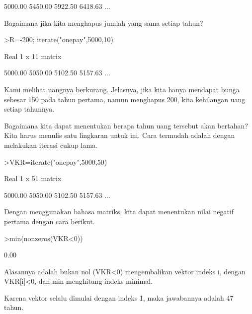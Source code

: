 \documentclass[a4paper,10pt]{article}
\begin{document}
\begin{eulernotebook}
\begin{eulercomment}
\begin{eulercomment}
\begin{eulercomment}
\begin{eulercomment}
\begin{eulercomment}
\begin{eulercomment}
\begin{eulercomment}
\begin{eulercomment}
\begin{eulercomment}
\begin{eulercomment}
\begin{eulercomment}
\begin{eulercomment}
\begin{euleroutput}
      5000.00     5450.00     5922.50     6418.63     ...
\end{euleroutput}
\begin{eulercomment}
Bagaimana jika kita menghapus jumlah yang sama setiap tahun?
\end{eulercomment}
\begin{eulerprompt}
>R=-200; iterate("onepay",5000,10)
\end{eulerprompt}
\begin{euleroutput}
  Real 1 x 11 matrix
  
      5000.00     5050.00     5102.50     5157.63     ...
\end{euleroutput}
\begin{eulercomment}
Kami melihat uangnya berkurang. Jelasnya, jika kita hanya mendapat
bunga sebesar 150 pada tahun pertama, namun menghapus 200, kita
kehilangan uang setiap tahunnya.

Bagaimana kita dapat menentukan berapa tahun uang tersebut akan
bertahan? Kita harus menulis satu lingkaran untuk ini. Cara termudah
adalah dengan melakukan iterasi cukup lama.
\end{eulercomment}
\begin{eulerprompt}
>VKR=iterate("onepay",5000,50)
\end{eulerprompt}
\begin{euleroutput}
  Real 1 x 51 matrix
  
      5000.00     5050.00     5102.50     5157.63     ...
\end{euleroutput}
\begin{eulercomment}
Dengan menggunakan bahasa matriks, kita dapat menentukan nilai negatif
pertama dengan cara berikut.
\end{eulercomment}
\begin{eulerprompt}
>min(nonzeros(VKR<0))
\end{eulerprompt}
\begin{euleroutput}
         0.00 
\end{euleroutput}
\begin{eulercomment}
Alasannya adalah bukan nol (VKR\textless{}0) mengembalikan vektor indeks i,
dengan VKR[i]\textless{}0, dan min menghitung indeks minimal.

Karena vektor selalu dimulai dengan indeks 1, maka jawabannya adalah
47 tahun.


\end{eulercomment}
\end{eulercomment}
\end{eulercomment}
\end{eulercomment}
\end{eulercomment}
\end{eulercomment}
\end{eulercomment}
\end{eulercomment}
\end{eulercomment}
\end{eulercomment}
\end{eulercomment}
\end{eulercomment}
\end{eulercomment}
\end{eulernotebook}
\end{document}
